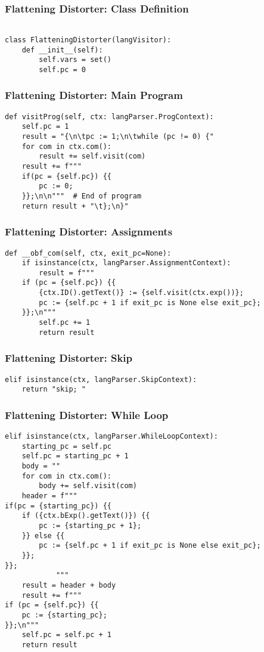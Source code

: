 \documentclass{beamer}
\begin{document}
\begin{frame}[fragile]
    \frametitle{Flattening Distorter: Class Definition}
    \scriptsize
    \begin{verbatim}

class FlatteningDistorter(langVisitor):
    def __init__(self):
        self.vars = set()
        self.pc = 0

    \end{verbatim}
\end{frame}

\begin{frame}[fragile]
    \frametitle{Flattening Distorter: Main Program}
    \scriptsize
    \begin{verbatim}
def visitProg(self, ctx: langParser.ProgContext):
    self.pc = 1
    result = "{\n\tpc := 1;\n\twhile (pc != 0) {"
    for com in ctx.com():
        result += self.visit(com)
    result += f"""
    if(pc = {self.pc}) {{ 
        pc := 0; 
    }};\n\n"""  # End of program
    return result + "\t};\n}"
    \end{verbatim}
\end{frame}


\begin{frame}[fragile]
    \frametitle{Flattening Distorter: Assignments}
    \scriptsize
    \begin{verbatim}
def __obf_com(self, ctx, exit_pc=None):
    if isinstance(ctx, langParser.AssignmentContext):
        result = f"""
    if (pc = {self.pc}) {{
        {ctx.ID().getText()} := {self.visit(ctx.exp())};
        pc := {self.pc + 1 if exit_pc is None else exit_pc};
    }};\n"""
        self.pc += 1
        return result
    \end{verbatim}
\end{frame}

\begin{frame}[fragile]
    \frametitle{Flattening Distorter: Skip}
    \scriptsize
    \begin{verbatim}
elif isinstance(ctx, langParser.SkipContext):
    return "skip; "
    \end{verbatim}
\end{frame}

\begin{frame}[fragile]
    \frametitle{Flattening Distorter: While Loop}
    \scriptsize
    \begin{verbatim}
elif isinstance(ctx, langParser.WhileLoopContext):
    starting_pc = self.pc
    self.pc = starting_pc + 1
    body = ""
    for com in ctx.com():
        body += self.visit(com)
    header = f"""
if(pc = {starting_pc}) {{
    if ({ctx.bExp().getText()}) {{
        pc := {starting_pc + 1};
    }} else {{
        pc := {self.pc + 1 if exit_pc is None else exit_pc};
    }};
}};
            """
    result = header + body
    result += f"""
if (pc = {self.pc}) {{
    pc := {starting_pc};                
}};\n"""
    self.pc = self.pc + 1
    return result
    \end{verbatim}
\end{frame}
\end{document}
